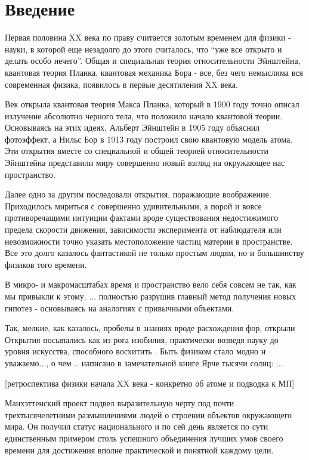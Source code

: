 \chapter*{Введение}


Первая половина XX века по праву считается золотым временем для физики - науки, в которой еще незадолго до этого считалось, что ``уже все открыто и делать особо нечего''.
Общая и специальная теория относительности Эйнштейна, квантовая теория Планка, квантовая механика Бора - все, без чего немыслима вся современная физика, появилось в первые десятиления XX века.

Век открыла квантовая теория Макса Планка, который в 1900 году точно описал излучение абсолютно черного тела, что положило начало квантовой теории.
Основываясь на этих идеях, Альберт Эйнштейн в 1905 году объяснил фотоэффект, а Нильс Бор в 1913 году построил свою квантовую модель атома.
Эти открытия вместе со специальной и общей теорией относительности Эйнштейна представили миру совершенно новый взгляд на окружающее нас пространство. 

Далее одно за другим последовали открытия, поражающие воображение. 
Приходилось мириться с совершенно удивительными, а порой и вовсе противоречащими интуиции фактами вроде существования недостижимого предела скорости движения, зависимости эксперимента от наблюдателя или невозможности точно указать местоположение частиц материи в пространстве.
Все это долго казалось фантастикой не только простым людям, но и большинству физиков того времени.


В микро- и макромасштабах время и пространство вело себя совсем не так, как мы привыкли к этому.
... полностью разрушив главный метод получения новых гипотез - основываясь на аналогиях с привычными объектами.


Так, мелкие, как казалось, пробелы в знаниях вроде расхождения фор, открыли  
Открытия посыпались как из рога изобилия, практически возведя науку до уровня искусства, способного восхитить . 
Быть физиком стало модно и уважаемо..., о чем .. написано в замечательной книге Ярче тысячи солнц: ...


[ретроспектива физики начала XX века - конкретно об атоме и подводка к МП]

Манхэттенский проект подвел выразительную черту под почти трехтысячелетними размышлениями людей о строении объектов окружающего мира.
Он получил статус национального и по сей день является по сути единственным примером столь успешного объединения лучших умов своего времени для достижения вполне практической и понятной каждому цели.

